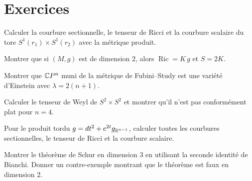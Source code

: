 \section{Exercices}

\begin{exercice}
Calculer la courbure sectionnelle, le tenseur de Ricci et la courbure scalaire
du tore $S^1(r_1) \times S^1(r_2)$ avec la m\'etrique produit.
\end{exercice}

\begin{exercice}
Montrer que si $(M, g)$ est de dimension $2$, alors
$\operatorname{Ric} = K\, g$ et $S = 2K$.
\end{exercice}

\begin{exercice}
Montrer que $\mathbb{C} P^n$ muni de la m\'etrique de Fubini--Study est une vari\'et\'e
d'Einstein avec $\lambda = 2(n+1)$.
\end{exercice}

\begin{exercice}
Calculer le tenseur de Weyl de $S^2 \times S^2$ et montrer qu'il n'est pas
conform\'ement plat pour $n = 4$.
\end{exercice}

\begin{exercice}
Pour le produit tordu $g = dt^2 + e^{2t} g_{\mathbb{R}^{n-1}}$, calculer toutes les
courbures sectionnelles, le tenseur de Ricci et la courbure scalaire.
\end{exercice}

\begin{exercice}
Montrer le th\'eor\`eme de Schur en dimension $3$ en utilisant la seconde identit\'e
de Bianchi. Donner un contre-exemple montrant que le th\'eor\`eme est faux en
dimension $2$.
\end{exercice}
